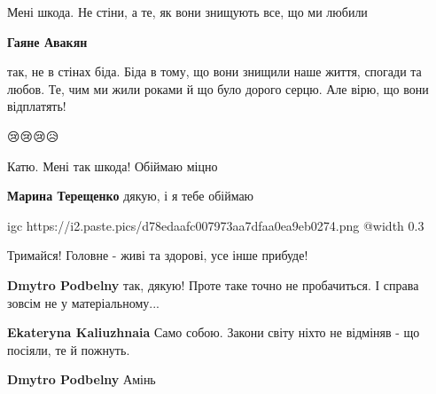  
 
 
 
 

\qqSecCmt


Мені шкода. Не стіни, а те, як вони знищують все, що ми любили

\begin{itemize} %
\textbf{Гаяне Авакян} 

так, не в стінах біда. Біда в тому, що вони знищили наше життя, спогади та
любов. Те, чим ми жили роками й що було дорого серцю. Але вірю, що вони
відплатять!

\end{itemize} %


😢😢😢😥



Катю. Мені так шкода! Обіймаю міцно

\begin{itemize} %
\textbf{Марина Терещенко} дякую, і я тебе обіймаю 💛
\end{itemize} %


\ifcmt
  igc https://i2.paste.pics/d78edaafc007973aa7dfaa0ea9eb0274.png
	@width 0.3
\fi


Тримайся! Головне - живі та здорові, усе інше прибуде!

\begin{itemize} %
\textbf{Dmytro Podbelny} так, дякую! Проте таке точно не пробачиться. І справа зовсім не у матеріальному...

\textbf{Ekateryna Kaliuzhnaia} Само собою. Закони світу ніхто не відміняв - що посіяли, те й пожнуть.

\textbf{Dmytro Podbelny} Амінь 🙏
\end{itemize} %

